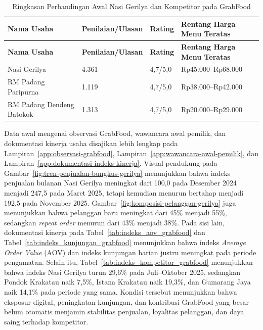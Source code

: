 \begingroup
    \footnotesize
    \begin{xltabular}{\textwidth}{|L{4.05cm}|C{2.55cm}|C{1.55cm}|Y|}
        \caption{Ringkasan Perbandingan Awal Nasi Gerilya dan Kompetitor pada GrabFood}
        \label{tab:ringkasan-kompetitor-awal-grabfood}\\
        \toprule
        \textbf{Nama Usaha} & \textbf{Penilaian/Ulasan} & \textbf{Rating} & \textbf{Rentang Harga Menu Teratas} \\ \hline
        \midrule
        \endfirsthead
        \toprule
        \textbf{Nama Usaha} & \textbf{Penilaian/Ulasan} & \textbf{Rating} & \textbf{Rentang Harga Menu Teratas} \\ \hline
        \midrule
        \endhead
        \endfoot
        \bottomrule
        \endlastfoot
        Nasi Gerilya & 4.361 & 4,7/5,0 & Rp45.000--Rp68.000 \\ \hline
        RM Padang Paripurna & 1.119 & 4,7/5,0 & Rp38.000--Rp42.000 \\ \hline
        RM Padang Dendeng Batokok & 1.313 & 4,7/5,0 & Rp20.000--Rp29.000 \\ \hline
    \end{xltabular}
\endgroup

Data awal mengenai observasi GrabFood, wawancara awal pemilik, dan dokumentasi kinerja usaha disajikan lebih lengkap pada Lampiran~\ref{app:observasi-grabfood}, Lampiran~\ref{app:wawancara-awal-pemilik}, dan Lampiran~\ref{app:dokumentasi-indeks-kinerja}. Visual pendukung pada Gambar~\ref{fig:tren-penjualan-bungkus-gerilya} menunjukkan bahwa indeks penjualan bulanan Nasi Gerilya meningkat dari 100,0 pada Desember 2024 menjadi 247,5 pada Maret 2025, tetapi kemudian menurun bertahap menjadi 192,5 pada November 2025. Gambar~\ref{fig:komposisi-pelanggan-gerilya} juga menunjukkan bahwa pelanggan baru meningkat dari 45\% menjadi 55\%, sedangkan \textit{repeat order} menurun dari 43\% menjadi 38\%. Pada sisi lain, dokumentasi kinerja pada Tabel~\ref{tab:indeks_aov_grabfood} dan Tabel~\ref{tab:indeks_kunjungan_grabfood} menunjukkan bahwa indeks \textit{Average Order Value} (AOV) dan indeks kunjungan harian justru meningkat pada periode pengamatan. Selain itu, Tabel~\ref{tab:indeks_kompetitor_grabfood} menunjukkan bahwa indeks Nasi Gerilya turun 29,6\% pada Juli--Oktober 2025, sedangkan Pondok Krakatau naik 7,5\%, Istana Krakatau naik 19,3\%, dan Gumarang Jaya naik 14,1\% pada periode yang sama. Kondisi tersebut menunjukkan bahwa eksposur digital, peningkatan kunjungan, dan kontribusi GrabFood yang besar belum otomatis menjamin stabilitas penjualan, loyalitas pelanggan, dan daya saing terhadap kompetitor.

